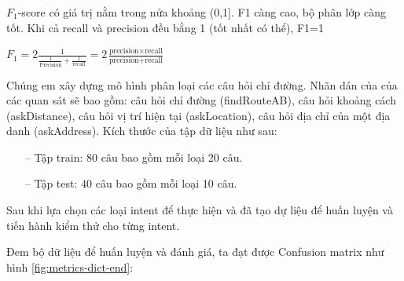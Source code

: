 $F_{1}$-score có giá trị nằm trong nửa khoảng (0,1]. F1 càng cao, bộ phân lớp càng tốt. Khi cả recall và precision đều bằng 1 (tốt nhất có thể), F1=1
\begin{center}
    $F_{1}=2\frac{1}{\frac{1}{\text{Precision}} + \frac{1}{\text{recall}}}= 2\frac{\text{precision} \times \text{recall}}{\text{precision} + \text{recall}}$
\end{center}

Chúng em xây dựng mô hình phân loại các câu hỏi chỉ đường. Nhãn dán của của các quan sát sẽ bao gồm: câu hỏi chỉ đường (findRouteAB), câu hỏi khoảng cách (askDistance), câu hỏi vị trí hiện tại (askLocation), câu hỏi địa chỉ của một địa danh (askAddress). Kích thước của tập dữ liệu như sau:
\begin{itemize}
    \item[--] Tập train: 80 câu bao gồm mỗi loại 20 câu.
    \item[--] Tập test: 40 câu bao gồm mỗi loại 10 câu.
\end{itemize}

Sau khi lựa chọn các loại intent để thực hiện và đã tạo dự liệu để huấn luyện và tiến hành kiểm thử cho từng intent.

Đem bộ dữ liệu để huấn luyện và đánh giá, ta đạt được Confusion matrix như hình \ref{fig:metrics-dict-end}:


